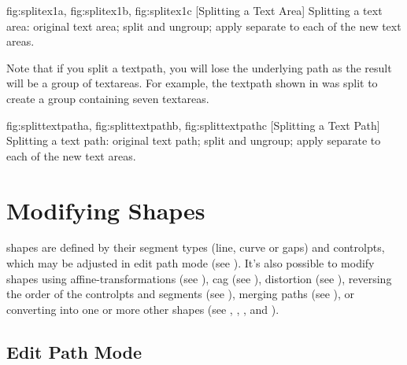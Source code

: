 {
  {fig:splitex1a}{}{},
  {fig:splitex1b}{}{},
  {fig:splitex1c}{}{}
} 
[Splitting a Text Area]
{Splitting a text area:
 original text area;
 split and ungroup;
 apply separate  
to each of the new text areas.}

Note that if you split a \gls*{textpath}, you will lose the
underlying path as the result will be a group of \glspl{textarea}.
For example, the \gls*{textpath} shown in
 was split to create a group
containing seven \glspl*{textarea}.

{
  {fig:splittextpatha}{}{},
  {fig:splittextpathb}{}{},
  {fig:splittextpathc}{}{}
}
[Splitting a Text Path]
{Splitting a text path:
 original text path;
 split and ungroup;
 apply
separate  to each of the new text areas.}


\chapter{Modifying Shapes}\label{sec:modshape}

\Glspl{shape} are defined by their segment types (line, \gls{curve}
or \glspl{gap}) and \glspl{controlpt}, which may be adjusted in edit
path mode (see ). It's also possible to
modify \glspl{shape} using \glspl{affine-transformation} (see
), \gls{cag} (see ),
distortion (see ), reversing the order of
the \glspl{controlpt} and segments (see ), merging paths (see
), or converting into one or more other
\glspl{shape} (see ,
, ,
 and
). 

\section{Edit Path Mode}\label{sec:editpath}


